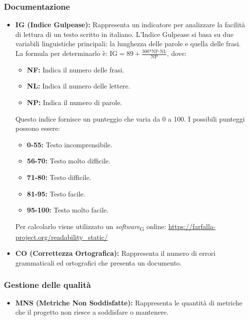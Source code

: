 \subsubsection{Documentazione}
\begin{itemize}
    \item \textbf{IG (Indice Gulpease):} Rappresenta un indicatore per analizzare la facilità di lettura di un testo scritto in italiano. L’Indice Gulpease si basa su due variabili linguistiche principali: la lunghezza delle parole e quella delle frasi. \\
    La formula per determinarlo è: \( \text{IG} = 89+\frac{\text{300*NF-NL}}{\text{NP}} \), dove:
    \begin{itemize}
        \item \textbf{NF:} Indica il numero delle frasi.
        \item \textbf{NL:} Indica il numero delle lettere.
        \item \textbf{NP:} Indica il numero di parole.
    \end{itemize}
    Questo indice fornisce un punteggio che varia da 0 a 100. I possibili punteggi possono essere:
    \begin{itemize}
        \item \textbf{0-55:} Testo incomprensibile.
        \item \textbf{56-70:} Testo molto difficile.
        \item \textbf{71-80:} Testo difficile.
        \item \textbf{81-95:} Testo facile.
        \item \textbf{95-100:} Testo molto facile.
    \end{itemize}
    Per calcolarlo viene utilizzato un \textit{software}\textsubscript{G} online: \url{https://farfalla-project.org/readability_static/}
    \item \textbf{CO (Correttezza Ortografica):} Rappresenta il numero di errori grammaticali ed ortografici che presenta un documento.
\end{itemize}
\subsubsection{Gestione delle qualità}
\begin{itemize}
    \item \textbf{MNS (Metriche Non Soddisfatte):} Rappresenta le quantità di metriche che il progetto non riesce a soddisfare o mantenere.
\end{itemize}
\newpage
